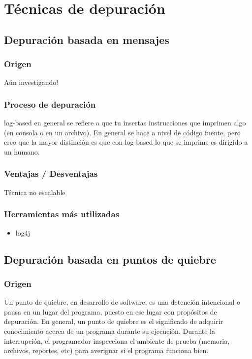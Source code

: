 \documentclass[12pt,a4paper]{report}
\begin{document}
	\section{Técnicas de depuración}
		\subsection{Depuración basada en mensajes}
			\subsubsection{Origen}

Aún investigando!

			\subsubsection{Proceso de depuración}

log-based en general se refiere a que tu insertas instrucciones que imprimen algo (en consola o en un archivo). En general se hace a nivel de código fuente, pero creo que la mayor distinción es que con log-based lo que se imprime es dirigido a un humano.

			\subsubsection{Ventajas / Desventajas}

Técnica no escalable

			\subsubsection{Herramientas más utilizadas}
\begin{itemize}
	\item log4j
\end{itemize}

		\subsection{Depuración basada en puntos de quiebre}
			\subsubsection{Origen}

Un punto de quiebre, en desarrollo de software, es una detención intencional o pausa en un lugar del programa, puesto en ese lugar con propósitos de depuración.  En general, un punto de quiebre es el significado de adquirir conocimiento acerca de un programa durante su ejecución.  Durante la interrupción, el programador inspecciona el ambiente de prueba (memoria, archivos, reportes, etc) para averiguar si el programa funciona bien.
\end{document}
